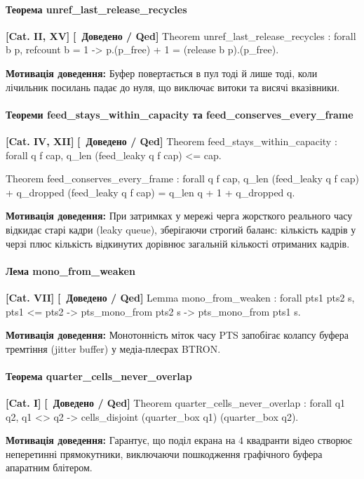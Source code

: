 \documentclass{article}
\let\originalfootnotesize\footnotesize
\let\oldverbatim\verbatim
\let\oldendverbatim\endverbatim
\renewenvironment{verbatim}{\originalfootnotesize\oldverbatim}{\oldendverbatim}
\newcommand{\thmcategory}[1]{{\small\textbf{\color{coreblue}[#1]}}}
\newcommand{\thmproven}{{\small\textbf{\color{productgreen}[\checkmark\ Доведено / Qed]}}}
\newcommand{\thmmotivation}[1]{%
  \par\smallskip\noindent\colorbox{boxbg}{\parbox{\dimexpr\linewidth-2\fboxsep\relax}{%
    \small\textbf{Мотивація доведення:} #1%
  }}\par\medskip
}
\begin{document}
\paragraph{Теорема unref\_last\_release\_recycles} \thmcategory{Cat. II, XV} \thmproven
\begin{verbatim}
Theorem unref_last_release_recycles : forall b p,
  refcount b = 1 ->
  p.(p_free) + 1 = (release b p).(p_free).
\end{verbatim}
\thmmotivation{Буфер повертається в пул тоді й лише тоді, коли лічильник посилань падає до нуля, що виключає витоки та висячі вказівники.}

\paragraph{Теореми feed\_stays\_within\_capacity та feed\_conserves\_every\_frame} \thmcategory{Cat. IV, XII} \thmproven
\begin{verbatim}
Theorem feed_stays_within_capacity : forall q f cap,
  q_len (feed_leaky q f cap) <= cap.

Theorem feed_conserves_every_frame : forall q f cap,
  q_len (feed_leaky q f cap) + q_dropped (feed_leaky q f cap) =
  q_len q + 1 + q_dropped q.
\end{verbatim}
\thmmotivation{При затримках у мережі черга жорсткого реального часу відкидає старі кадри (leaky queue), зберігаючи строгий баланс: кількість кадрів у черзі плюс кількість відкинутих дорівнює загальній кількості отриманих кадрів.}

\paragraph{Лема mono\_from\_weaken} \thmcategory{Cat. VII} \thmproven
\begin{verbatim}
Lemma mono_from_weaken : forall pts1 pts2 s,
  pts1 <= pts2 -> pts_mono_from pts2 s -> pts_mono_from pts1 s.
\end{verbatim}
\thmmotivation{Монотонність міток часу PTS запобігає колапсу буфера тремтіння (jitter buffer) у медіа-плеєрах BTRON.}

\paragraph{Теорема quarter\_cells\_never\_overlap} \thmcategory{Cat. I} \thmproven
\begin{verbatim}
Theorem quarter_cells_never_overlap : forall q1 q2,
  q1 <> q2 -> cells_disjoint (quarter_box q1) (quarter_box q2).
\end{verbatim}
\thmmotivation{Гарантує, що поділ екрана на 4 квадранти відео створює неперетинні прямокутники, виключаючи пошкодження графічного буфера апаратним блітером.}
\end{document}
